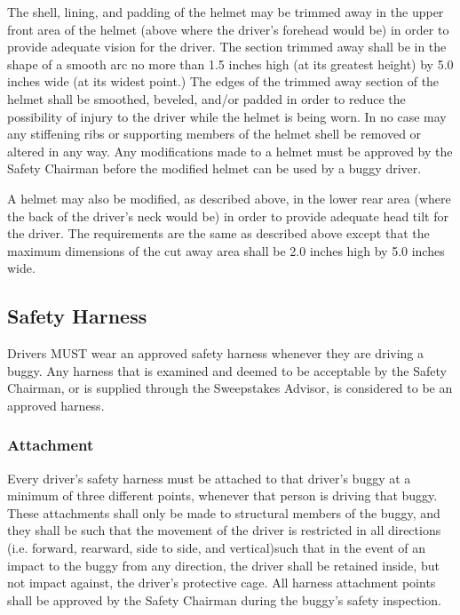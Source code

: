 The shell, lining, and padding of the helmet may be trimmed away in the upper front area of the helmet (above where the driver's forehead would be) in order to provide adequate vision for the driver. The section trimmed away shall be in the shape of a smooth arc no more than 1.5 inches high (at its greatest height) by 5.0 inches wide (at its widest point.) The edges of the trimmed away section of the helmet shall be smoothed, beveled, and/or padded in order to reduce the possibility of injury to the driver while the helmet is being worn. In no case may any stiffening ribs or supporting members of the helmet shell be removed or altered in any way. Any modifications made to a helmet must be approved by the Safety Chairman before the modified helmet can be used by a buggy driver.

A helmet may also be modified, as described above, in the lower rear area (where the back of the driver's neck would be) in order to provide adequate head tilt for the driver. The requirements are the same as described above except that the maximum dimensions of the cut away area shall be 2.0 inches high by 5.0 inches wide.

\subsection{Safety Harness}

Drivers MUST wear an approved safety harness whenever they are driving a buggy. Any harness that is examined and deemed to be acceptable by the Safety Chairman, or is supplied through the Sweepstakes Advisor, is considered to be an approved harness.

\subsubsection{Attachment}

Every driver's safety harness must be attached to that driver's buggy at a minimum of three different points, whenever that person is driving that buggy. These attachments shall only be made to structural members of the buggy, and they shall be such that the movement of the driver is restricted in all directions (i.e. forward, rearward, side to side, and vertical)such that in the event of an impact to the buggy from any direction, the driver shall be retained inside, but not impact against, the driver's protective cage. All harness attachment points shall be approved by the Safety Chairman during the buggy's safety inspection.

